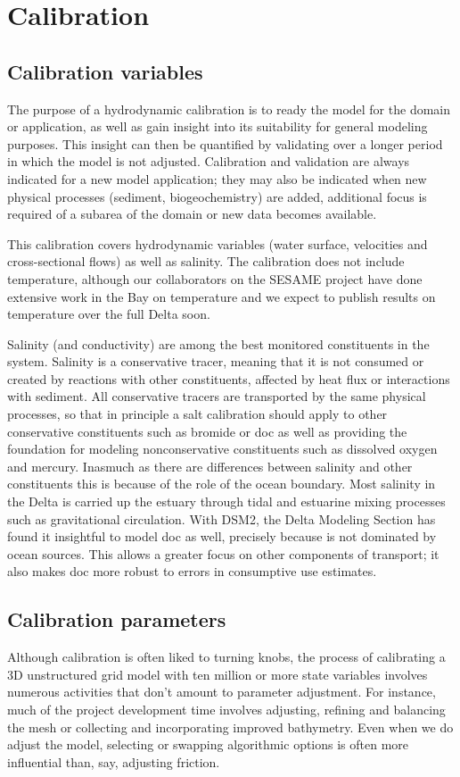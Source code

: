 \chapter{Calibration}
\label{chap:calibrate}
\section{Calibration variables}
The purpose of a hydrodynamic calibration is to ready the model for the domain or application, 
as well as gain insight into its suitability for general modeling purposes.  This insight can then 
be quantified by validating over a longer period in which the model is not adjusted. Calibration 
and validation are always indicated for a new model application; they may also be indicated when 
new physical processes (sediment, biogeochemistry) are added, additional focus
is required of a subarea of the domain or new data becomes available.

This calibration covers hydrodynamic variables (water surface, velocities and cross-sectional flows) as well as salinity.
The calibration does not include temperature, although our collaborators on the SESAME project have done extensive work in the Bay on temperature and we expect to publish results on temperature over the full Delta soon.

Salinity (and conductivity) are among the best monitored constituents in the system. 
Salinity is a conservative tracer, meaning that it is not consumed or created by reactions with other 
constituents, affected by heat flux or interactions with sediment. All conservative tracers 
are transported by the same physical processes, so that in principle a salt calibration should 
apply to other conservative constituents such as bromide or \gls{doc} as well as providing the foundation
for modeling nonconservative constituents such as dissolved oxygen and mercury. Inasmuch as there are
differences between salinity and other constituents this is because of the role of the ocean boundary.
Most salinity in the Delta is carried up the estuary through tidal and estuarine mixing processes such as gravitational circulation. 
With DSM2, the Delta Modeling Section has found it insightful to model \gls{doc} as well, precisely because
is not dominated by ocean sources. This allows a greater focus on other components of transport; it also makes
\gls{doc} more robust to errors in consumptive use estimates.

\section{Calibration parameters}
Although calibration is often liked to turning knobs, the process of calibrating a 3D unstructured 
grid model with ten million or more state variables involves numerous activities that don't amount to parameter adjustment. 
For instance, much of the project development time involves adjusting, refining and balancing the mesh or collecting
and incorporating improved bathymetry. Even when we do adjust the model, selecting or swapping algorithmic options is often more influential than, say, adjusting friction. 


